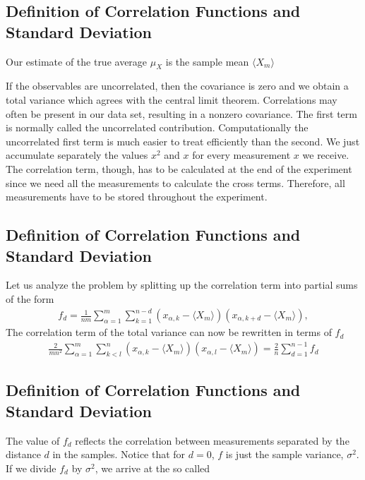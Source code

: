 \documentclass[letterpaper,10pt,english]{sphinxmanual}
\begin{document}
\subsection{Definition of Correlation Functions and Standard Deviation}
\label{\detokenize{chapter2:id5}}
Our estimate of the true average \(\mu_{X}\) is the sample mean \(\langle X_m \rangle\)

If the
observables are uncorrelated, then the covariance is zero and we obtain a total variance
which agrees with the central limit theorem. Correlations may often be present in our data set, resulting in a non\sphinxhyphen{}zero covariance.  The first term is normally called the uncorrelated
contribution.
Computationally the uncorrelated first term is much easier to treat
efficiently than the second.
We just accumulate separately the values \(x^2\) and \(x\) for every
measurement \(x\) we receive. The correlation term, though, has to be
calculated at the end of the experiment since we need all the
measurements to calculate the cross terms. Therefore, all measurements
have to be stored throughout the experiment.


\subsection{Definition of Correlation Functions and Standard Deviation}
\label{\detokenize{chapter2:id6}}
Let us analyze the problem by splitting up the correlation term into
partial sums of the form
\begin{equation*}
\begin{split}
f_d = \frac{1}{nm}\sum_{\alpha=1}^m\sum_{k=1}^{n-d}(x_{\alpha,k}-\langle X_m \rangle)(x_{\alpha,k+d}-\langle X_m \rangle),
\end{split}
\end{equation*}
The correlation term of the total variance can now be rewritten in terms of
\(f_d\)
\begin{equation*}
\begin{split}
\frac{2}{mn^2}\sum_{\alpha=1}^m\sum_{k<l}^n (x_{\alpha,k}-\langle X_m \rangle)(x_{\alpha,l}-\langle X_m \rangle)=
\frac{2}{n}\sum_{d=1}^{n-1} f_d
\end{split}
\end{equation*}

\subsection{Definition of Correlation Functions and Standard Deviation}
\label{\detokenize{chapter2:id7}}
The value of \(f_d\) reflects the correlation between measurements
separated by the distance \(d\) in the samples.  Notice that for
\(d=0\), \(f\) is just the sample variance, \(\sigma^2\). If we divide \(f_d\)
by \(\sigma^2\), we arrive at the so called 
\end{document}
